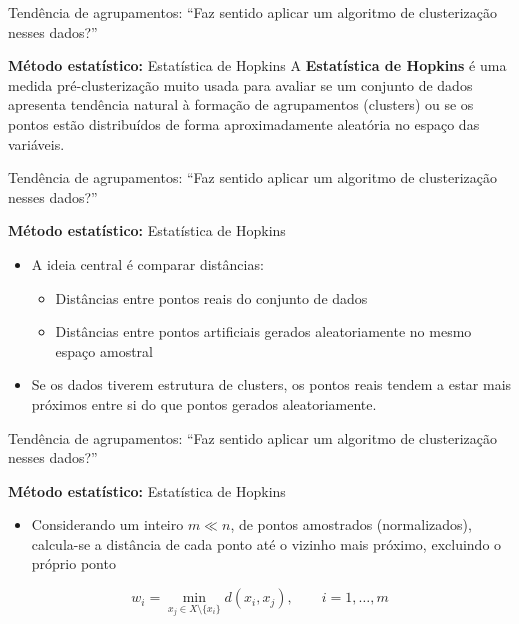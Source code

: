 \documentclass[
  ignorenonframetext,
  aspectratio=169,
]{beamer}
\providecommand{\tightlist}{%
  \setlength{\itemsep}{0pt}\setlength{\parskip}{0pt}}
\begin{document}
\begin{frame}{Tendência de agrupamentos: ``Faz sentido aplicar um
algoritmo de clusterização nesses dados?''}
\label{tenduxeancia-de-agrupamentos-faz-sentido-aplicar-um-algoritmo-de-clusterizauxe7uxe3o-nesses-dados}
\begin{block}{\textbf{Método estatístico:} Estatística de Hopkins}
\label{muxe9todo-estatuxedstico-estatuxedstica-de-hopkins}
A \textbf{Estatística de Hopkins} é uma medida pré-clusterização muito
usada para avaliar se um conjunto de dados apresenta tendência natural à
formação de agrupamentos (clusters) ou se os pontos estão distribuídos
de forma aproximadamente aleatória no espaço das variáveis.
\end{block}
\end{frame}

\begin{frame}{Tendência de agrupamentos: ``Faz sentido aplicar um
algoritmo de clusterização nesses dados?''}
\label{tenduxeancia-de-agrupamentos-faz-sentido-aplicar-um-algoritmo-de-clusterizauxe7uxe3o-nesses-dados-1}
\begin{block}{\textbf{Método estatístico:} Estatística de Hopkins}
\label{muxe9todo-estatuxedstico-estatuxedstica-de-hopkins-1}
\begin{itemize}
\tightlist
\item
  A ideia central é comparar distâncias:

  \begin{itemize}
  \tightlist
  \item
    Distâncias entre pontos reais do conjunto de dados
  \item
    Distâncias entre pontos artificiais gerados aleatoriamente no mesmo
    espaço amostral
  \end{itemize}
\item
  Se os dados tiverem estrutura de clusters, os pontos reais tendem a
  estar mais próximos entre si do que pontos gerados aleatoriamente.
\end{itemize}
\end{block}
\end{frame}

\begin{frame}{Tendência de agrupamentos: ``Faz sentido aplicar um
algoritmo de clusterização nesses dados?''}
\label{tenduxeancia-de-agrupamentos-faz-sentido-aplicar-um-algoritmo-de-clusterizauxe7uxe3o-nesses-dados-2}
\begin{block}{\textbf{Método estatístico:} Estatística de Hopkins}
\label{muxe9todo-estatuxedstico-estatuxedstica-de-hopkins-2}
\begin{itemize}
\tightlist
\item
  Considerando um inteiro \(m \ll n\), de pontos amostrados
  (normalizados), calcula-se a distância de cada ponto até o vizinho
  mais próximo, excluindo o próprio ponto
\end{itemize}

\[
w_i
=
\min_{x_j \in X \setminus \{x_i\}}
d(x_i, x_j),
\qquad i = 1,\ldots,m
\]
\end{block}
\end{frame}
\end{document}

